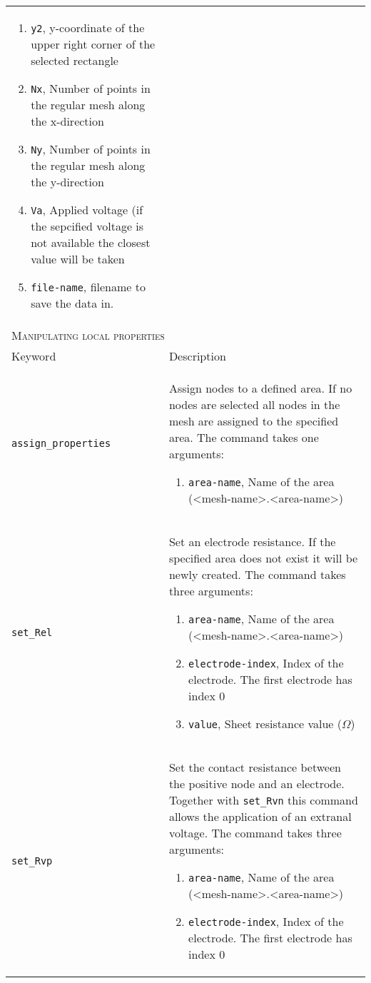 \documentclass[noshowpacs,preprintnumbers,amsmath,amssymb, letter]{revtex4}
\begin{document}
\begin{longtable}{p{}p{}}
\begin{enumerate}
\item \texttt{y2}, y-coordinate of the upper right corner of the selected rectangle
\item \texttt{Nx}, Number of points in the regular mesh along the x-direction
\item \texttt{Ny}, Number of points in the regular mesh along the y-direction
\item \texttt{Va}, Applied voltage (if the sepcified voltage is not available the closest value will be taken
\item \texttt{file-name}, filename to save the data in.
\end{enumerate}\\
\multicolumn{2}{l}{\textsc{Manipulating local properties}} \\*
\hline
Keyword & Description \\
\texttt{assign\_properties}	&  Assign nodes to a defined area. If no nodes are selected all nodes in the mesh are assigned to the specified area. The command takes one arguments:
\begin{enumerate}
\item \texttt{area-name}, Name of the area (\textless mesh-name\textgreater .\textless area-name\textgreater )
\end{enumerate}\\
\texttt{set\_Rel}	&  Set an electrode resistance. If the specified area does not exist it will be newly created. The command takes three arguments:
\begin{enumerate}
\item \texttt{area-name}, Name of the area (\textless mesh-name\textgreater .\textless area-name\textgreater )
\item \texttt{electrode-index}, Index of the electrode. The first electrode has index 0
\item \texttt{value}, Sheet resistance value ($\Omega$)
\end{enumerate}\\
\texttt{set\_Rvp}	&  Set the contact resistance between the positive node and an electrode. Together with \texttt{set\_Rvn} this command allows the application of an extranal voltage. The command takes three arguments:
\begin{enumerate}
\item \texttt{area-name}, Name of the area (\textless mesh-name\textgreater .\textless area-name\textgreater )
\item \texttt{electrode-index}, Index of the electrode. The first electrode has index 0

\end{enumerate}
\end{longtable}
\end{document}
